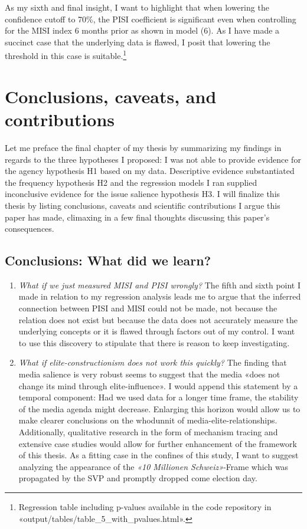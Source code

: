 \documentclass[11pt,a4paper]{article}
\begin{document}
As my sixth and final insight, I want to highlight that when lowering the confidence cutoff to 70\%, the PISI coefficient is significant even when controlling for the MISI index 6 months prior as shown in model (6). As I have made a succinct case that the underlying data is flawed, I posit that lowering the threshold in this case is suitable.\footnote{Regression table including p-values available in the code repository in «output/tables/table\_5\_with\_pvalues.html».}


\section{Conclusions, caveats, and contributions}
Let me preface the final chapter of my thesis by summarizing my findings in regards to the three hypotheses I proposed: I was not able to provide evidence for the agency hypothesis H1 based on my data. Descriptive evidence substantiated the frequency hypothesis H2 and the regression models I ran supplied inconclusive evidence for the issue salience hypothesis H3. I will finalize this thesis by listing conclusions, caveats and scientific contributions I argue this paper has made, climaxing in a few final thoughts discussing this paper's consequences.


\subsection{Conclusions: What did we learn?}
\begin{enumerate}
    \item \textit{What if we just measured MISI and PISI wrongly?} The fifth and sixth point I made in relation to my regression analysis leads me to argue that the inferred connection between PISI and MISI could not be made, not because the relation does not exist but because the data does not accurately measure the underlying concepts or it is flawed through factors out of my control. I want to use this discovery to stipulate that there is reason to keep investigating.
    \item \textit{What if elite-constructionism does not work this quickly?} The finding that media salience is very robust seems to suggest that the media «does not change its mind through elite-influence». I would append this statement by a temporal component: Had we used data for a longer time frame, the stability of the media agenda might decrease. Enlarging this horizon would allow us to make clearer conclusions on the whodunnit of media-elite-relationships. Additionally, qualitative research in the form of mechanism tracing and extensive case studies would allow for further enhancement of the framework of this thesis. As a fitting case in the confines of this study, I want to suggest analyzing the appearance of the \textit{«10 Millionen Schweiz»}-Frame which was propagated by the SVP and promptly dropped come election day. 
\end{enumerate}
\end{document}

